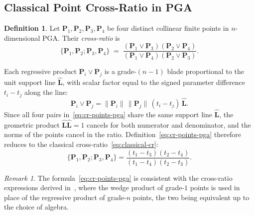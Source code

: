 \documentclass{birkjour}
\theoremstyle{definition}
\newtheorem{definition}[theorem]{Definition}
\theoremstyle{remark}
\newtheorem{remark}[theorem]{Remark}
\begin{document}
\subsection{Classical Point Cross-Ratio in PGA}
\label{sec:classicalcrossratio}
\begin{definition}
\label{def:cr-points-pga}
Let $\mathbf{P}_1, \mathbf{P}_2, \mathbf{P}_3, \mathbf{P}_4$ be four distinct collinear finite points in $n$-dimensional PGA. Their \emph{cross-ratio} is
\begin{equation}
  \{\mathbf{P}_1, \mathbf{P}_2; \mathbf{P}_3, \mathbf{P}_4\}
  \;=\;
  \frac{(\mathbf{P}_1 \vee \mathbf{P}_3)(\mathbf{P}_2 \vee \mathbf{P}_4)}
       {(\mathbf{P}_1 \vee \mathbf{P}_4)(\mathbf{P}_2 \vee \mathbf{P}_3)}.
  \label{eq:cr-points-pga}
\end{equation}
\end{definition}
Each regressive product $\mathbf{P}_i \vee \mathbf{P}_j$ is a grade-$(n-1)$ blade proportional to the unit support line $\hat{\mathbf{L}}$, with scalar factor equal to the signed parameter difference $t_i - t_j$ along the line:
\begin{equation}
  \mathbf{P}_i \vee \mathbf{P}_j
  = \|\mathbf{P}_i\|\,\|\mathbf{P}_j\|\,(t_i - t_j)\,\hat{\mathbf{L}}.
\end{equation}
Since all four pairs in~\eqref{eq:cr-points-pga} share the same
support line $\hat{\mathbf{L}}$, the geometric product
$\hat{\mathbf{L}}\hat{\mathbf{L}} = 1$ cancels for both numerator and
denominator, and the norms of the points cancel in the ratio.
Definition~\eqref{eq:cr-points-pga} therefore reduces to the
classical cross-ratio~\eqref{eq:classical-cr}:
\begin{equation}
  \{\mathbf{P}_1, \mathbf{P}_2; \mathbf{P}_3, \mathbf{P}_4\}
  = \frac{(t_1 - t_3)(t_2 - t_4)}{(t_1 - t_4)(t_2 - t_3)}.
\end{equation}
\begin{remark}
The formula~\eqref{eq:cr-points-pga} is consistent with the cross-ratio
expressions derived in~\cite{lasenby1999analysis,bayro2002geometric},
where the wedge product of grade-$1$ points is used in place of the regressive product of grade-$n$ points, the two being equivalent up to the choice of algebra.
\end{remark}
\end{document}
